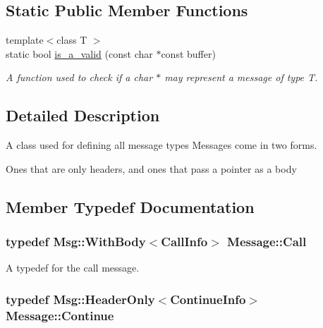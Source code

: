 \subsection*{Static Public Member Functions}
\begin{DoxyCompactItemize}
\item 
{\footnotesize template$<$class T $>$ }\\static bool \hyperlink{class_message_ada73859c8d199a7925b0ba3999cc3eef}{is\+\_\+a\+\_\+valid} (const char $\ast$const buffer)
\begin{DoxyCompactList}\small\item\em A function used to check if a char $\ast$ may represent a message of type T. \end{DoxyCompactList}\end{DoxyCompactItemize}


\subsection{Detailed Description}
A class used for defining all message types Messages come in two forms. 

Ones that are only headers, and ones that pass a pointer as a body 

\subsection{Member Typedef Documentation}
\subsubsection[{\texorpdfstring{Call}{Call}}]{\setlength{\rightskip}{0pt plus 5cm}typedef {\bf Msg\+::\+With\+Body}$<${\bf Call\+Info}$>$ {\bf Message\+::\+Call}}\hypertarget{class_message_a65eabf9d1dcd603d2e7c14c5274a5bdb}{}\label{class_message_a65eabf9d1dcd603d2e7c14c5274a5bdb}


A typedef for the call message. 

\subsubsection[{\texorpdfstring{Continue}{Continue}}]{\setlength{\rightskip}{0pt plus 5cm}typedef {\bf Msg\+::\+Header\+Only}$<${\bf Continue\+Info}$>$ {\bf Message\+::\+Continue}}\hypertarget{class_message_a3575d142bf847cc5a7aecd718434fe4f}{}\label{class_message_a3575d142bf847cc5a7aecd718434fe4f}


